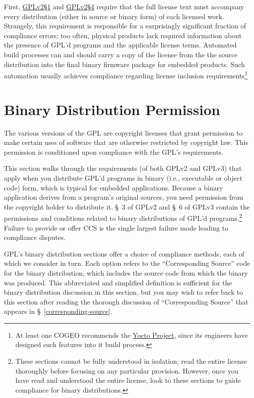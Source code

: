 First, \hyperref[GPLv2s1]{GPLv2\S1} and \hyperref[GPLv2s4]{GPLv2\S4} require
that the full license text must accompany every distribution (either in
source or binary form) of each licensed work.  Strangely, this requirement is
responsible for a surprisingly significant fraction of compliance errors; too
often, physical products lack required information about the presence of
GPL'd programs and the applicable license terms.  Automated build processes
can and should carry a copy of the license from the the source distribution
into the final binary firmware package for embedded products.  Such
automation usually achieves compliance regarding license inclusion
requirements\footnote{At least one COGEO recommends the
  \href{https://www.yoctoproject.org/}{Yocto Project}, since its engineers
  have designed such features into it build process.}

\section{Binary Distribution Permission}
\label{binary-distribution-permission}


The various versions of the GPL are copyright licenses that grant
permission to make certain uses of software that are otherwise restricted
by copyright law.  This permission is conditioned upon compliance with the
GPL's requirements.

This section walks through the requirements (of both GPLv2 and GPLv3) that
apply when you distribute GPL'd programs in binary (i.e., executable or
object code) form, which is typical for embedded applications.  Because a
binary application derives from a program's original sources, you need
permission from the copyright holder to distribute it.  \S~3 of GPLv2 and
\S~6 of GPLv3 contain the permissions and conditions related to binary
distributions of GPL'd programs.\footnote{These sections cannot be fully
  understood in isolation; read the entire license thoroughly before
  focusing on any particular provision.  However, once you have read and
  understood the entire license, look to these sections to guide
  compliance for binary distributions.}  Failure to provide or offer CCS is the
single largest failure mode leading to compliance disputes.



GPL's binary distribution sections offer a choice of compliance methods,
each of which we consider in turn.  Each option refers to the
``Corresponding Source'' code for the binary distribution, which includes
the source code from which the binary was produced.  This abbreviated and
simplified definition is sufficient for the binary distribution discussion
in this section, but you may wish to refer back to this section after
reading the thorough discussion of ``Corresponding Source'' that appears
in \S~\ref{corresponding-source}.

